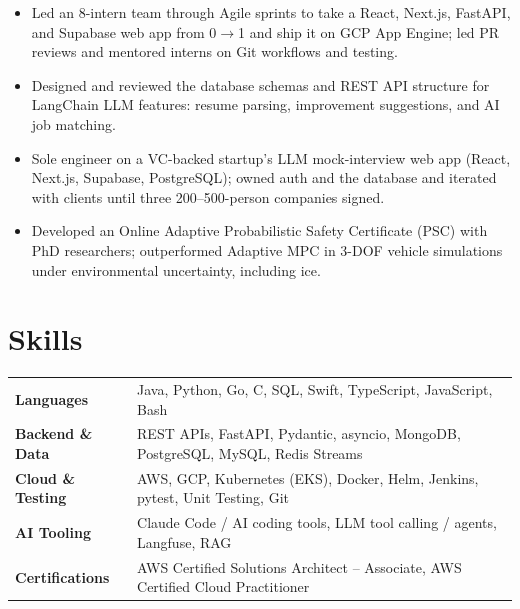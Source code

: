 \documentclass[11pt, letterpaper]{article}
\begin{document}
\begin{itemize}
  \item Led an 8-intern team through Agile sprints to take a React, Next.js, FastAPI, and Supabase web app from 0$\to$1 and ship it on GCP App Engine; led PR reviews and mentored interns on Git workflows and testing.
  \item Designed and reviewed the database schemas and REST API structure for LangChain LLM features: resume parsing, improvement suggestions, and AI job matching.
\end{itemize}

\begin{itemize}
  \item Sole engineer on a VC-backed startup's LLM mock-interview web app (React, Next.js, Supabase, PostgreSQL); owned auth and the database and iterated with clients until three 200--500-person companies signed.
\end{itemize}

\begin{itemize}
  \item Developed an Online Adaptive Probabilistic Safety Certificate (PSC) with PhD researchers; outperformed Adaptive MPC in 3-DOF vehicle simulations under environmental uncertainty, including ice.
\end{itemize}

\section{Skills}
\begin{tabularx}{\textwidth}{@{}l @{\hspace{7pt}} >{\raggedright\arraybackslash}X@{}}
  \textbf{Languages} & Java, Python, Go, C, SQL, Swift, TypeScript, JavaScript, Bash \\[1pt]
  \textbf{Backend \& Data} & REST APIs, FastAPI, Pydantic, asyncio, MongoDB, PostgreSQL, MySQL, Redis Streams \\[1pt]
  \textbf{Cloud \& Testing} & AWS, GCP, Kubernetes (EKS), Docker, Helm, Jenkins, pytest, Unit Testing, Git \\[1pt]
  \textbf{AI Tooling} & Claude Code / AI coding tools, LLM tool calling / agents, Langfuse, RAG \\[1pt]
  \textbf{Certifications} & AWS Certified Solutions Architect -- Associate, AWS Certified Cloud Practitioner \\
\end{tabularx}
\end{document}
